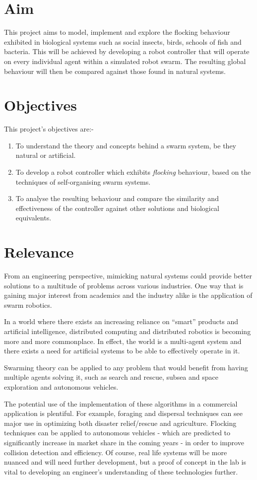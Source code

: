 \section{Aim}
This project aims to model, implement and explore the flocking behaviour exhibited in biological systems such as social insects, birds, schools of fish and bacteria. This will be achieved by developing a robot controller that will operate on every individual agent within a simulated robot swarm. The resulting global behaviour will then be compared against those found in natural systems.


\section{Objectives}
 This project's objectives are:-

\begin{enumerate}
	\item To understand the theory and concepts behind a swarm system, be they natural or artificial.
	\item To develop a robot controller which exhibits \textit{flocking} behaviour, based on the techniques of self-organising swarm systems.
	\item To analyse the resulting behaviour and compare the similarity and effectiveness of the controller against other solutions and biological equivalents.
\end{enumerate}

\section{Relevance}

From an engineering perspective, mimicking natural systems could provide better solutions to a multitude of problems across various industries. One way that is gaining major interest from academics and the industry alike is the application of swarm robotics.

In a world where there exists an increasing reliance on ``smart'' products and artificial intelligence, distributed computing and distributed robotics is becoming more and more commonplace. In effect, the world is a multi-agent system and there exists a need for artificial systems to be able to effectively operate in it.

Swarming theory can be applied to any problem that would benefit from having multiple agents solving it, such as search and rescue, subsea and space exploration and autonomous vehicles. 

The potential use of the implementation of these algorithms in a commercial application is plentiful. For example, foraging and dispersal techniques can see major use in optimizing both disaster relief/rescue and agriculture. Flocking techniques can be applied to autonomous vehicles - which are predicted to significantly increase in market share in the coming years - in order to improve collision detection and efficiency. Of course, real life systems will be more nuanced and will need further development, but a proof of concept in the lab is vital to developing an engineer’s understanding of these technologies further.

